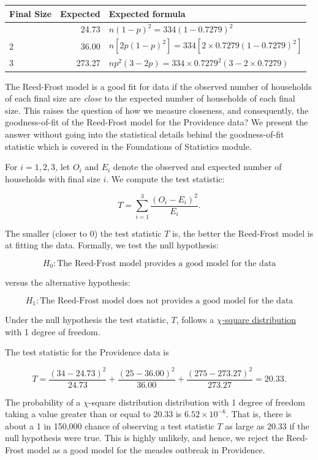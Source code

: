 \documentclass[
]{book}
\begin{document}
\begin{longtable}[]{@{}lrl@{}}
\toprule\noalign{}
Final Size & Expected & Expected formula \\
\midrule\noalign{}
\endhead
\bottomrule\noalign{}
\endlastfoot
1 & 24.73 & \(n(1-p)^2 =334 (1-0.7279)^2\) \\
2 & 36.00 & \(n [2 p(1-p)^2] =334 \left[2 \times 0.7279 (1-0.7279)^2 \right]\) \\
3 & 273.27 & \(n p^2 (3-2p) =334 \times0.7279^2 (3 - 2 \times 0.7279)\) \\
\end{longtable}

The Reed-Frost model is a good fit for data if the observed number of households of each final size are \emph{close} to the expected number of households of each final size. This raises the question of how we measure closeness, and consequently, the goodness-of-fit of the Reed-Frost model for the Providence data? We present the answer without going into the statistical details behind the goodness-of-fit statistic which is covered in the Foundations of Statistics module.

For \(i=1, 2, 3\), let \(O_i\) and \(E_i\) denote the observed and expected number of households with final size \(i\). We compute the test statistic:

\[ T = \sum_{i=1}^3 \frac{(O_i -E_i)^2}{E_i}. \]

The smaller (closer to 0) the test statistic \(T\) is, the better the Reed-Frost model is at fitting the data.
Formally, we test the null hypothesis:

\[ H_0: \mbox{The Reed-Frost model provides a good model for the data} \]

versus the alternative hypothesis:

\[ H_1: \mbox{The Reed-Frost model does not provides a good model for the data} \]

Under the null hypothesis the test statistic, \(T\), follows a \href{https://en.wikipedia.org/wiki/Chi-squared_distribution}{\(\chi\)-square distribution} with 1 degree of freedom.

The test statistic for the Providence data is

\[ T = \frac{(34- 24.73)^2}{24.73} +  \frac{(25- 36.00)^2}{36.00} +  \frac{(275- 273.27)^2}{273.27} = 20.33. \]

The probability of a \(\chi\)-square distribution distribution with 1 degree of freedom taking a value greater than or equal to \(20.33\) is \(6.52 \times 10^{-6}\). That is, there is about a 1 in 150,000 chance of observing a test statistic \(T\) as large as 20.33 if the null hypothesis were true. This is highly unlikely, and hence, we reject the Reed-Frost model as a good model for the measles outbreak in Providence.
\end{document}
